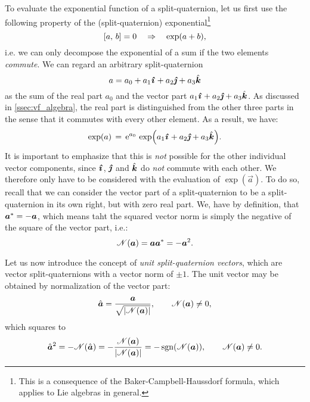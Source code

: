 To evaluate the exponential function of a split-quaternion, let us first use the following property of the (split-quaternion) exponential\footnote{This is a consequence of the Baker-Campbell-Haussdorf formula, which applies to Lie algebras in general.} \cite{Hall2013}
\begin{equation}
    \liebr{a}{b} = 0 \quad \Rightarrow \quad \exp(a + b),
\end{equation}
i.e. we can only decompose the exponential of a sum if the two elements \emph{commute}. We can regard an arbitrary split-quaternion
\begin{equation}
     a = \quat{a_0}{a_1}{a_2}{a_3}
\end{equation}
as the sum of the real part \(a_0\) and the vector part \(\quatvec{a_1}{a_2}{a_3}\). As discussed in \cref{ssec:vf_algebra}, the real part is distinguished from the other three parts in the sense that it commutes with every other element. As a result, we have:
\begin{equation}
     \exp(a) \, = \,\ec^{a_0}\,\exp(\quatvec{a_1}{a_2}{a_3}).
\end{equation}
It is important to emphasize that this is \emph{not} possible for the other individual vector components, since $\quati$, $\quatj$ and $\quatk$ do \emph{not} commute with each other. We therefore only have to be considered with the evaluation of \(\exp(\vec{a})\). To do so, recall that we can consider the vector part of a split-quaternion to be a split-quaternion in its own right, but with zero real part. We, have by definition, that \( \conj{\vec{a}} = -\vec{a} \), which means taht the squared vector norm is simply the negative of the square of the vector part, i.e.:
\begin{equation}
     \mathscr{N}(\vec{a}) = \vec{a} \conj{\vec{a}} = -\vec{a}^2.
\end{equation}

Let us now introduce the concept of \emph{unit split-quaternion vectors}, which are vector split-quaternions with a vector norm of \(\pm 1\). The unit vector may be obtained by normalization of the vector part:
\begin{equation}
     \hat{\vec{a}} = \frac{\vec{a}}{\sqrt{\abs{\mathscr{N}(\vec{a})}}}, \qquad \mathscr{N}(\vec{a}) \neq 0,
\end{equation}
which squares to
\begin{equation}
     \hat{\vec{a}}^2 = - \mathscr{N}(\hat{\vec{a}}) 
                   = - \frac{\mathscr{N}(\vec{a})}{\abs{\mathscr{N}(\vec{a})}} 
                   = - \sgn(\mathscr{N}(\vec{a})), \qquad \mathscr{N}(\vec{a}) \neq 0.
\end{equation}

